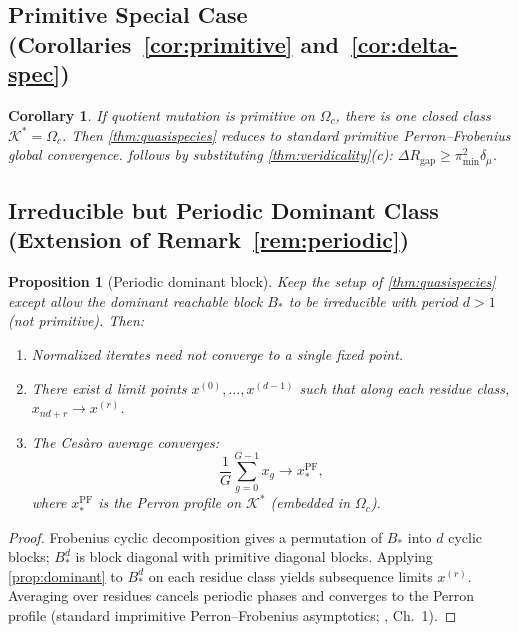 \documentclass[12pt]{article}
\newtheorem{proposition}[theorem]{Proposition}
\newtheorem{corollary}[theorem]{Corollary}
\newcommand{\dmu}{\delta_\mu}
\newcommand{\pimin}{\pi_{\min}}
\begin{document}
\subsection{Primitive Special Case (Corollaries~\ref*{cor:primitive} and~\ref*{cor:delta-spec})}\label{app:primitive}

\begin{corollary}\label{cor:primitive-app}
If quotient mutation is primitive on $\Omega_c$, there is one closed class $\mathcal{K}^* = \Omega_c$. Then \cref{thm:quasispecies} reduces to standard primitive Perron--Frobenius global convergence.  follows by substituting \cref{thm:veridicality}(c): $\Delta R_{\mathrm{gap}} \ge \pimin^2 \dmu$.
\end{corollary}

\subsection{Irreducible but Periodic Dominant Class (Extension of Remark~\ref*{rem:periodic})}\label{app:periodic}

\begin{proposition}[Periodic dominant block]\label{prop:periodic}
Keep the setup of \cref{thm:quasispecies} except allow the dominant reachable block $B_*$ to be irreducible with period $d > 1$ (not primitive). Then:

\begin{enumerate}[label=(\alph*)]
\item Normalized iterates need not converge to a single fixed point.
\item There exist $d$ limit points $x^{(0)}, \ldots, x^{(d-1)}$ such that along each residue class, $x_{nd+r} \to x^{(r)}$.
\item The Ces\`aro average converges:
\begin{equation}
\frac{1}{G} \sum_{g=0}^{G-1} x_g \to x^{\mathrm{PF}}_*,
\end{equation}
where $x^{\mathrm{PF}}_*$ is the Perron profile on $\mathcal{K}^*$ (embedded in $\Omega_c$).
\end{enumerate}
\end{proposition}

\begin{proof}
Frobenius cyclic decomposition gives a permutation of $B_*$ into $d$ cyclic blocks; $B_*^d$ is block diagonal with primitive diagonal blocks. Applying \cref{prop:dominant} to $B_*^d$ on each residue class yields subsequence limits $x^{(r)}$. Averaging over residues cancels periodic phases and converges to the Perron profile (standard imprimitive Perron--Frobenius asymptotics; \citealt{seneta_2006}, Ch.~1).
\end{proof}
\end{document}
